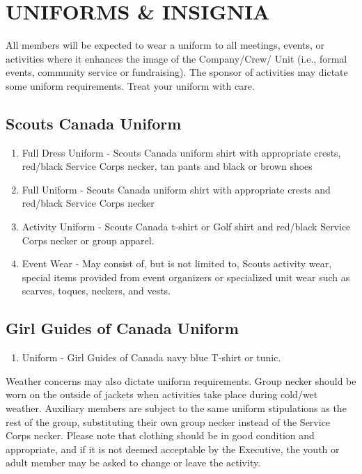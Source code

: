 \documentclass{Service_Corps_Document}
\begin{document}
    \section{UNIFORMS \& INSIGNIA }
    All members will be expected to wear a uniform to all meetings, events, or activities where it enhances the image of the Company/Crew/ Unit (i.e., formal events, community service or fundraising).
    The sponsor of activities may dictate some uniform requirements.
    Treat your uniform with care.
    
    \subsection{Scouts Canada Uniform}
    \begin{enumerate}
        \item Full Dress Uniform - Scouts Canada uniform shirt with appropriate crests, red/black Service Corps necker, tan pants and black or brown shoes
        \item Full Uniform - Scouts Canada uniform shirt with appropriate crests and red/black Service Corps necker
        \item Activity Uniform - Scouts Canada t-shirt or Golf shirt and red/black Service Corps necker or group apparel.
        \item Event Wear - May consist of, but is not limited to, Scouts activity wear, special items provided from event organizers or specialized unit wear such as scarves, toques, neckers, and vests.
    \end{enumerate}
    \subsection{Girl Guides of Canada Uniform}
    \begin{enumerate}
        \item Uniform - Girl Guides of Canada navy blue T-shirt or tunic.
    \end{enumerate}

    Weather concerns may also dictate uniform requirements. Group necker should be worn on the outside of jackets when activities take place during cold/wet weather. Auxiliary members are subject to the same uniform stipulations as the rest of the group, substituting their own group necker instead of the Service Corps necker. 
    Please note that clothing should be in good condition and appropriate, and if it is not deemed acceptable by the Executive, the youth or adult member may be asked to change or leave the activity.
\end{document}
